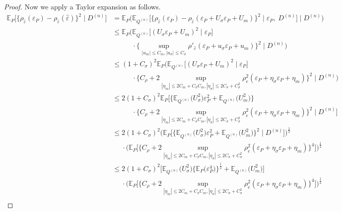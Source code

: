 \documentclass[aos]{imsart}
\newcommand{\E}{\mathbb{E}}
\begin{document}
\begin{proof}
		Now we apply a Taylor expansion as follows.
		\begin{align*}
			\E_P\Big[\big\{\rho_{\hat\varepsilon}(\varepsilon_P)-\rho_{\hat\varepsilon}(\hat\varepsilon)\big\}^2 \; \Big| \; D^{(n)}\Big] &= \E_P\Big(\E_{Q^{(n)}}\Big[\big\{\rho_{\hat\varepsilon}(\varepsilon_P)-\rho_{\hat\varepsilon}(\varepsilon_P + U_\sigma\varepsilon_P + U_m)\big\}^2 \; \Big| \; \varepsilon_P, \; D^{(n)}\Big] \; \Big| \; D^{(n)} \Big)\\
			&\leq \E_P\Bigg(\E_{Q^{(n)}}\big[(U_\sigma\varepsilon_P+U_m)^2\; \big| \; \varepsilon_P\big] \\
			&\phantom{=\E_P\Bigg(}\cdot\bigg\{\sup_{|u_m|\leq C_m, |u_\sigma|\leq C_\sigma} \rho'_{\hat\varepsilon} (\varepsilon_P+u_\sigma \varepsilon_P + u_m)\bigg\}^2  \; \Bigg| \; D^{(n)} \Bigg)\\
			&\leq (1+C_\sigma)^2\E_P\Bigg(\E_{Q^{(n)}}\big[(U_\sigma\varepsilon_P+U_m)^2\; \big| \; \varepsilon_P \big] \\
			&\phantom{
				\leq \E_P\Bigg(
			}  \cdot\bigg\{C_\rho + 2\sup_{|\eta_m|\leq 2C_m+C_\sigma C_m, |\eta_\sigma|\leq 2C_\sigma+C_\sigma^2} \rho_{e}^2 (\varepsilon_P+\eta_\sigma \varepsilon_P + \eta_m)\bigg\}^2  \; \Bigg| \; D^{(n)} \Bigg)\\
			&\leq 2(1+C_\sigma)^2\E_P\Bigg[\Big\{\E_{Q^{(n)}}\big(U_\sigma^2\big)\varepsilon_P^2+\E_{Q^{(n)}}\big(U_m^2\big)\Big\} \\
			&\phantom{ \leq \E_P\Bigg( } \cdot \bigg\{C_\rho  + 2\sup_{|\eta_m|\leq 2C_m+C_\sigma C_m, |\eta_\sigma|\leq 2C_\sigma+C_\sigma^2}  \rho_{e}^2 (\varepsilon_P+\eta_\sigma \varepsilon_P + \eta_m)\bigg\}^2  \; \Bigg| \; D^{(n)} \Bigg]\\
			&\leq 2(1+C_\sigma)^2\bigg(\E_P\bigg[\Big\{\E_{Q^{(n)}}\big(U_\sigma^2\big)\varepsilon_P^2+\E_{Q^{(n)}}\big(U_m^2\big)\Big\}^2 \; \bigg|\; D^{(n)} \bigg]\bigg)^{\frac12}\\
			&\phantom{\leq}\cdot \Bigg(\E_P\Bigg[\bigg\{C_\rho + 2\sup_{|\eta_m|\leq 2C_m+C_\sigma C_m, |\eta_\sigma|\leq 2C_\sigma+C_\sigma^2} \rho_{e}^2 (\varepsilon_P+\eta_\sigma \varepsilon_P + \eta_m)\bigg\}^4 \Bigg]\Bigg)^{\frac12}\\
			&\leq 2(1+C_\sigma)^2\Big[\E_{Q^{(n)}}\big(U_\sigma^2\big)\big\{\E_P\big(\varepsilon_P^4\big)\big\}^{\frac12}+\E_{Q^{(n)}}\big(U_m^2\big)\Big]\\
			&\phantom{\leq}\cdot \Bigg(\E_P\Bigg[\bigg\{C_\rho + 2\sup_{|\eta_m|\leq 2C_m+C_\sigma C_m, |\eta_\sigma|\leq 2C_\sigma+C_\sigma^2}  \rho_{e}^2 (\varepsilon_P+\eta_\sigma \varepsilon_P + \eta_m)\bigg\}^4 \Bigg]\Bigg)^{\frac12}\\

\end{align*}
\end{proof}
\end{document}
